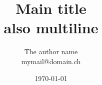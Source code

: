 \documentclass[german,mathserif]{beamer}
\title[Short title]{Main title\\also multiline}
\institute[The institute abbr.]{\texttt{[image: img/logo-zhaw.pdf]}\\\vspace*{1em}\textit{The whole institute name}}
\author[Author short]{The author name\\ {\tiny mymail@domain.ch}}
\date{\today}
\begin{document}
  \begin{frame}[plain]
    \titlepage
  \end{frame}

  \begin{frame}
    \tableofcontents
  \end{frame}
	
  
	
\end{document}
